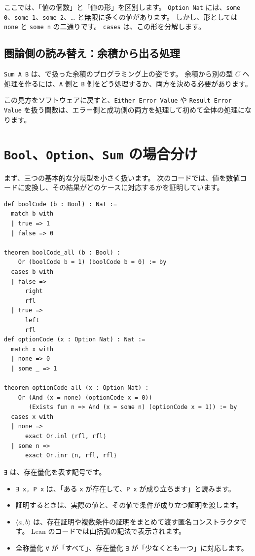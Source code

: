 ここでは、「値の個数」と「値の形」を区別します。
\texttt{Option Nat} には、\texttt{some 0}、\texttt{some 1}、\texttt{some 2}、\ldots{} と無限に多くの値があります。
しかし、形としては \texttt{none} と \texttt{some n} の二通りです。
\texttt{cases} は、この形を分解します。

\subsection{圏論側の読み替え：余積から出る処理}

\texttt{Sum A B} は、で扱った余積のプログラミング上の姿です。
余積から別の型 \(C\) へ処理を作るには、\texttt{A} 側と \texttt{B} 側をどう処理するか、両方を決める必要があります。

この見方をソフトウェアに戻すと、\texttt{Either Error Value} や \texttt{Result Error Value} を扱う関数は、エラー側と成功側の両方を処理して初めて全体の処理になります。

\section{\texttt{Bool}、\texttt{Option}、\texttt{Sum} の場合分け}

まず、三つの基本的な分岐型を小さく扱います。
次のコードでは、値を数値コードに変換し、その結果がどのケースに対応するかを証明しています。

\begin{listing}[htbp]
\begin{verbatim}
def boolCode (b : Bool) : Nat :=
  match b with
  | true => 1
  | false => 0

theorem boolCode_all (b : Bool) :
    Or (boolCode b = 1) (boolCode b = 0) := by
  cases b with
  | false =>
      right
      rfl
  | true =>
      left
      rfl
def optionCode (x : Option Nat) : Nat :=
  match x with
  | none => 0
  | some _ => 1

theorem optionCode_all (x : Option Nat) :
    Or (And (x = none) (optionCode x = 0))
       (Exists fun n => And (x = some n) (optionCode x = 1)) := by
  cases x with
  | none =>
      exact Or.inl ⟨rfl, rfl⟩
  | some n =>
      exact Or.inr ⟨n, rfl, rfl⟩
\end{verbatim}
\caption{\texttt{Bool} と \texttt{Option} の場合分け}
\label{lst:ch19-basic-cases}
\end{listing}

\texttt{∃} は、存在量化を表す記号です。
\begin{itemize}
\item \texttt{∃ x, P x} は、「ある \texttt{x} が存在して、\texttt{P x} が成り立ちます」と読みます。
\item 証明するときは、実際の値と、その値で条件が成り立つ証明を渡します。
\item \(\langle a, b\rangle\) は、存在証明や複数条件の証明をまとめて渡す匿名コンストラクタです。
Lean のコードでは山括弧の記法で表示されます。
\item 全称量化 \texttt{∀} が「すべて」、存在量化 \texttt{∃} が「少なくとも一つ」に対応します。
\end{itemize}


